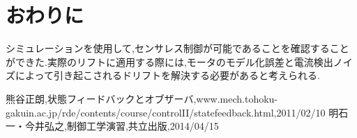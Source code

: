 \documentclass[twocolumn,11pt]{abst}
\begin{document}
\section{おわりに}
シミュレーションを使用して,センサレス制御が可能であることを確認することができた.実際のリフトに適用する際には,モータのモデル化誤差と電流検出ノイズによって引き起こされるドリフトを解決する必要があると考えられる.

\begin{thebibliography}{8}
 熊谷正朗,状態フィードバックとオブザーバ,www.mech.tohoku-gakuin.ac.jp\slash{}rde\slash{}contents\slash{}course\slash{}controlII\slash{}statefeedback.html,2011\slash{}02\slash{}10
 明石　一・今井弘之,制御工学演習,共立出版,2014\slash{}04\slash{}15
\end{thebibliography}
\end{document}
